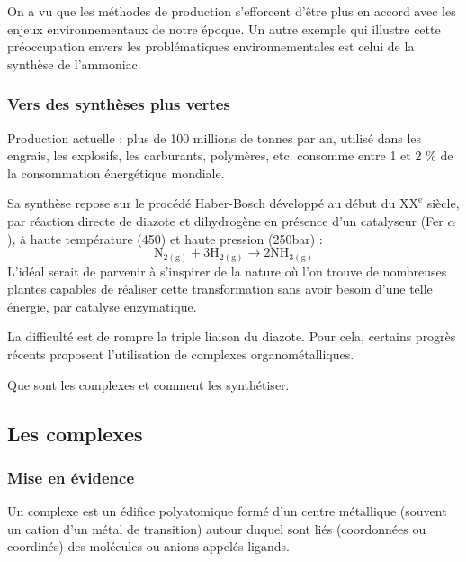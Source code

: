 \begin{transition}
On a vu que les méthodes de production s'efforcent d'être plus en accord avec les enjeux environnementaux de notre époque.
Un autre exemple qui illustre cette préoccupation envers les problématiques environnementales est celui de la synthèse de l'ammoniac.
\end{transition}

\subsubsection{Vers des synthèses plus vertes}

Production actuelle : plus de 100 millions de tonnes par an, utilisé dans les engrais, les explosifs, les carburants, polymères, etc. consomme entre 1 et 2 \% de la consommation énergétique mondiale.

Sa synthèse repose sur le procédé Haber-Bosch développé au début du $\mathrm{XX^e}$ siècle, par réaction directe de diazote et dihydrogène en présence d'un catalyseur (Fer $\alpha$), à haute température (\unit{450}{\celsius}) et haute pression (\unit{250}{bar}) :
\begin{equation*}
\mathrm{N_{2(g)}} + 3\mathrm{H_{2(g)}} \rightarrow 2\mathrm{NH_{3(g)}}
\end{equation*}
L'idéal serait de parvenir à s'inspirer de la nature où l'on trouve de nombreuses plantes capables de réaliser cette transformation sans avoir besoin d'une telle énergie, par catalyse enzymatique.

La difficulté est de rompre la triple liaison du diazote. 
Pour cela, certains progrès récents proposent l'utilisation de complexes organométalliques.

\begin{transition}
Que sont les complexes et comment les synthétiser.
\end{transition}

\subsection{Les complexes}

\subsubsection{Mise en évidence}

Un complexe est un édifice polyatomique formé d'un centre métallique (souvent un cation d'un métal de transition) autour duquel sont liés (coordonnées ou coordinés) des molécules ou anions appelés ligands.

